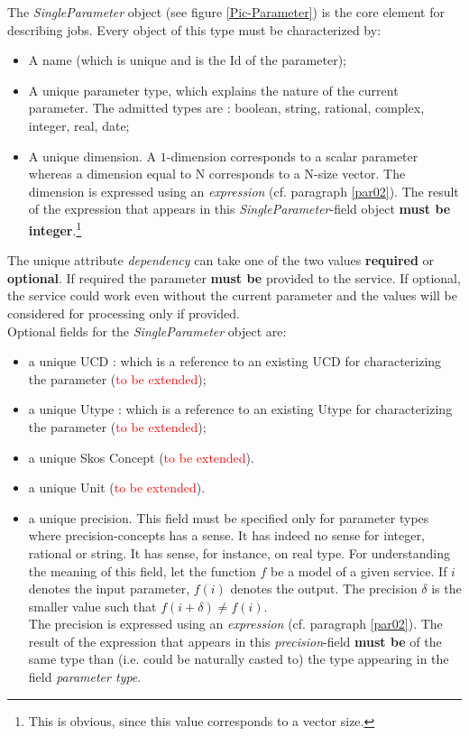 \documentclass[a4paper,11pt] {article}
\begin{document}
The {\it SingleParameter} object (see figure \ref{Pic-Parameter}) is the core element for describing
jobs.
Every object of this type must be characterized by:
\begin{itemize}
\item A name (which is unique and is the Id of the parameter);
\item A unique parameter type, which explains the nature of the current parameter. The admitted
types are : boolean, string, rational, complex, integer, real, date;
\item A unique dimension. A $1$-dimension corresponds to a scalar parameter whereas a dimension
equal to N corresponds to a N-size vector. The dimension is expressed using an {\it expression} (cf.
paragraph \ref{par02}). The result of the expression that appears in this {\it
SingleParameter}-field object {\bf must be integer}.\footnote{This is obvious, since this value
corresponds to a vector size.}
\end{itemize}
The unique attribute {\it dependency} can take one of the two values {\bf required} or {\bf
optional}. If required the parameter {\bf must be} provided to the service. If optional, the service
could work even without the current parameter and the values will be considered for processing only
if provided.\\

Optional fields for the {\it SingleParameter} object are:
\begin{itemize}
\item a unique UCD : which is a reference to an existing UCD for characterizing the parameter
(\textcolor{red}{to be extended});
\item a unique Utype  : which is a reference to an existing Utype for characterizing the parameter
(\textcolor{red}{to be extended});
\item a unique Skos Concept  (\textcolor{red}{to be extended}).
\item a unique Unit (\textcolor{red}{to be extended}).
\item a unique precision. This field must be specified only for parameter types where
precision-concepts has a sense. It has indeed no sense for integer, rational or string. It has
sense, for instance, on real type. For understanding the meaning of this field, let the function $f$
be a model of a given service. If $i$ denotes the input parameter, $f(i)$ denotes the output. The
precision $\delta$ is the smaller value such that $f(i+\delta) \neq f(i)$.\\ The precision is
expressed using an {\it expression} (cf. paragraph \ref{par02}). The result of the expression that
appears in this {\it precision}-field  {\bf must be} of the same type than (i.e. could be naturally
casted to) the type appearing in the field {\it parameter type}.
\end{itemize}
\end{document}
